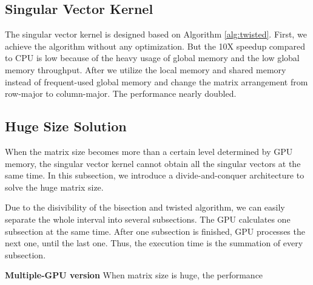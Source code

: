 \subsection{Singular Vector Kernel}
The singular vector kernel is designed based on Algorithm \ref{alg:twisted}.
First, we achieve the algorithm without any optimization.
But the 10X speedup compared to CPU is low because of the heavy usage of global memory and the low global memory throughput.
After we utilize the local memory and shared memory instead of frequent-used global memory and change the matrix arrangement from row-major to column-major.
The performance nearly doubled.

\subsection{Huge Size Solution}
When the matrix size becomes more than a certain level determined by GPU memory, the singular vector kernel cannot obtain all the singular vectors at the same time.
In this subsection, we introduce a divide-and-conquer architecture to solve the huge matrix size.

Due to the disivibility of the bisection and twisted algorithm, we can easily separate the whole interval into several subsections.
The GPU calculates one subsection at the same time.
After one subsection is finished, GPU processes the next one, until the last one.
Thus, the execution time is the summation of every subsection.

\textbf{Multiple-GPU version}
When matrix size is huge, the performance 
